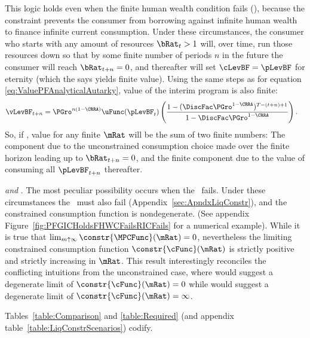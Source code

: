 \documentclass[BufferStockTheory]{subfiles}
\begin{document}
This logic holds even when the finite human wealth condition fails (\cncl{\FHWC}), because the constraint prevents the consumer from borrowing against infinite human wealth to finance infinite current consumption.  Under these circumstances, the consumer who starts with any amount of resources $\bRat_{t} > 1$ will, over time, run those resources down so that by some finite number of periods $n$ in the future the consumer will reach $\bRat_{t+n} = 0$, and thereafter will set $\cLevBF = \pLevBF$ for eternity (which the {\PFFVAC} says yields finite value).  Using the same steps as for equation \eqref{eq:ValuePFAnalyticalAutarky}, value of the interim program is also finite: \hypertarget{PFFVAC}{} \hypertarget{PFVAF}{}
\begin{align*}
  \vLevBF_{t+n} %
 & = \PGro^{n(1-\CRRA)} \uFunc(\pLevBF_{t})\left(\frac{1-(\DiscFac
        \PGro^{1-\CRRA})^{T-(t+n)+1}}{1-\DiscFac \PGro^{1-\CRRA}}\right).
\end{align*}
So, if \cncl{\FHWC}, value for any finite $\mRat$ will be the sum of two finite numbers: The component due to the unconstrained consumption choice made over the finite horizon leading up to $\bRat_{t+n} = 0$, and the finite component due to the value of consuming all $\pLevBF_{t+n}$ thereafter.
  
\hypertarget{RICandFHWCFail}{}
\textit{{\GICAbs} and {\cncl{\RIC}}}.  
The most peculiar possibility occurs when the \RIC~fails.  Under these circumstances the \FHWC~must also fail (Appendix~\ref{sec:ApndxLiqConstr}), and the constrained consumption function is nondegenerate.  (See appendix Figure~\ref{fig:PFGICHoldsFHWCFailsRICFails} for a numerical example).  While it is true that $\lim_{m \uparrow \infty}
\constr{\MPCFunc}(\mRat) = 0$, nevertheless the limiting constrained
consumption function $\constr{\cFunc}(\mRat)$ is strictly positive
and strictly increasing in $\mRat$.  This result interestingly
reconciles the conflicting intuitions from the unconstrained case,
where \cncl{\RIC} would suggest a degenerate limit of
$\constr{\cFunc}(\mRat)=0$ while \cncl{\FHWC} would suggest a
degenerate limit of $\constr{\cFunc}(\mRat)=\infty$.

\hypertarget{RelatePFGICFHWCRICPFFVACText}{}
Tables~\ref{table:Comparison} and \ref{table:Required} (and appendix table~\ref{table:LiqConstrScenarios}) codify. 
\end{document}
